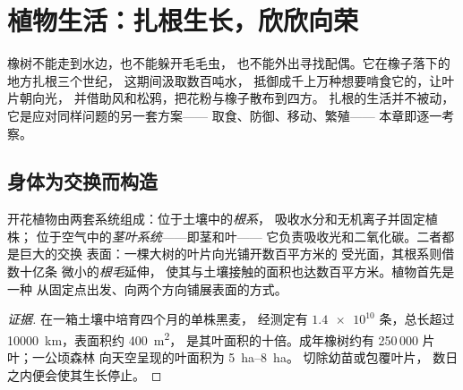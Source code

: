 \chapter{植物生活：扎根生长，欣欣向荣}\label{ch:g12:plant-rooted-life}

橡树不能走到水边，也不能躲开毛毛虫，
也不能外出寻找配偶。它在橡子落下的地方扎根三个世纪，
这期间汲取数百吨水，
抵御成千上万种想要啃食它的，让叶片朝向光，
并借助风和松鸦，把花粉与橡子散布到四方。
扎根的生活并不被动，它是应对同样问题的另一套方案——
取食、防御、移动、繁殖——
本章即逐一考察。

\section{身体为交换而构造}

\begin{proposition}\label{prop:g12:plant-rooted-life:surfaces}
开花植物由两套系统组成：位于土壤中的\emph{根系}，
吸收水分和无机离子并固定植株；
位于空气中的\emph{茎叶系统}——即茎和叶——
它负责吸收光和二氧化碳。二者都是巨大的交换
表面：一棵大树的叶片向光铺开数百平方米的
受光面，其根系则借数十亿条
微小的\emph{根毛}延伸，
使其与土壤接触的面积也达数百平方米。植物首先是一种
从固定点出发、向两个方向铺展表面的方式。
\end{proposition}
\begin{proof}[证据]
在一箱土壤中培育四个月的单株黑麦，
经测定有 $\num{1.4e10}$ 条，总长超过
\qty{10000}{km}，表面积约 \qty{400}{m^2}，
是其叶面积的十倍。成年橡树约有 250\,000 片叶；一公顷森林
向天空呈现的叶面积为 \qtyrange{5}{8}{ha}。
切除幼苗或包覆叶片，
数日之内便会使其生长停止。
\end{proof}

